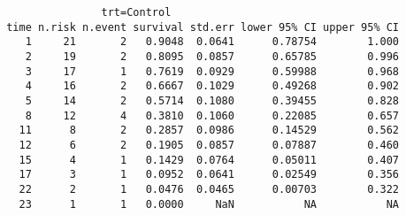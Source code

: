 \begin{enumerate}[(a)]
\begin{enumerate}[(i)]
\begin{footnotesize}
\begin{verbatim}
                trt=Control 
 time n.risk n.event survival std.err lower 95% CI upper 95% CI
    1     21       2   0.9048  0.0641      0.78754        1.000
    2     19       2   0.8095  0.0857      0.65785        0.996
    3     17       1   0.7619  0.0929      0.59988        0.968
    4     16       2   0.6667  0.1029      0.49268        0.902
    5     14       2   0.5714  0.1080      0.39455        0.828
    8     12       4   0.3810  0.1060      0.22085        0.657
   11      8       2   0.2857  0.0986      0.14529        0.562
   12      6       2   0.1905  0.0857      0.07887        0.460
   15      4       1   0.1429  0.0764      0.05011        0.407
   17      3       1   0.0952  0.0641      0.02549        0.356
   22      2       1   0.0476  0.0465      0.00703        0.322
   23      1       1   0.0000     NaN           NA           NA


\end{verbatim}
\end{footnotesize}
\end{enumerate}
\end{enumerate}
